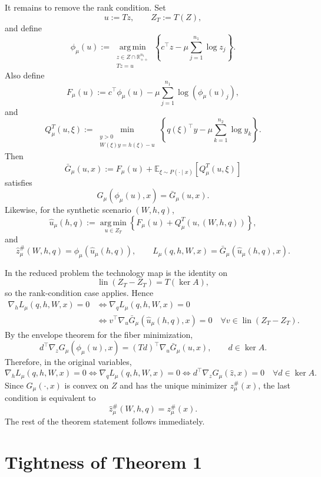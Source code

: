 \documentclass{article}
\newcommand{\E}{\mathbb{E}}
\newcommand{\1}{\mathbf{1}}
\newcommand{\argmin}{\operatorname*{arg\,min}}
\theoremstyle{plain}
\theoremstyle{definition}
\theoremstyle{remark}
\begin{document}
It remains to remove the rank condition. Set
\[
        u:=Tz,
        \qquad
        Z_T:=T(Z),
\]
and define
\[
        \phi_\mu(u)
        :=
        \argmin_{\substack{z\in Z\cap\mathbb R^{n_1}_{++}\\ Tz=u}}
        \left\{
        c^\top z-\mu\sum_{j=1}^{n_1}\log z_j
        \right\}.
\]
Also define
\[
        F_\mu(u)
        :=
        c^\top\phi_\mu(u)
        -
        \mu\sum_{j=1}^{n_1}\log(\phi_\mu(u)_j),
\]
and
\[
        Q_\mu^T(u,\xi)
        :=
        \min_{\substack{y>0\\ W(\xi)y=h(\xi)-u}}
        \left\{
        q(\xi)^\top y-\mu\sum_{k=1}^{n_2}\log y_k
        \right\}.
\]
Then
\[
        \bar G_\mu(u,x)
        :=
        F_\mu(u)
        +
        \E_{\xi\sim P(\cdot\mid x)}
        [Q_\mu^T(u,\xi)]
\]
satisfies
\[
        G_\mu(\phi_\mu(u),x)=\bar G_\mu(u,x).
\]
Likewise, for the synthetic scenario $(W,h,q)$,
\[
        \hat u_\mu(h,q)
        :=
        \argmin_{u\in Z_T}
        \left\{
        F_\mu(u)+Q_\mu^T(u,(W,h,q))
        \right\},
\]
and
\[
        \hat z_\mu^\#(W,h,q)=\phi_\mu(\hat u_\mu(h,q)),
        \qquad
        L_\mu(q,h,W,x)=\bar G_\mu(\hat u_\mu(h,q),x).
\]

In the reduced problem the technology map is the identity on
\[
        \operatorname{lin}(Z_T-Z_T)=T(\ker A),
\]
so the rank-condition case applies. Hence
\[
\begin{aligned}
        \nabla_h L_\mu(q,h,W,x)=0
        &\iff
        \nabla_q L_\mu(q,h,W,x)=0
        \\
        &\iff
        v^\top\nabla_u\bar G_\mu(\hat u_\mu(h,q),x)=0
        \quad\forall v\in\operatorname{lin}(Z_T-Z_T).
\end{aligned}
\]
By the envelope theorem for the fiber minimization,
\[
        d^\top\nabla_zG_\mu(\phi_\mu(u),x)
        =
        (Td)^\top\nabla_u\bar G_\mu(u,x),
        \qquad d\in\ker A.
\]
Therefore, in the original variables,
\[
        \nabla_h L_\mu(q,h,W,x)=0
        \iff
        \nabla_q L_\mu(q,h,W,x)=0
        \iff
        d^\top\nabla_zG_\mu(\hat z,x)=0
        \quad\forall d\in\ker A.
\]
Since $G_\mu(\cdot,x)$ is convex on $Z$ and has the unique minimizer $z_\mu^\#(x)$, the last condition is equivalent to
\[
        \hat z_\mu^\#(W,h,q)=z_\mu^\#(x).
\]
The rest of the theorem statement follows immediately.

\section{Tightness of Theorem 1}
\end{document}
